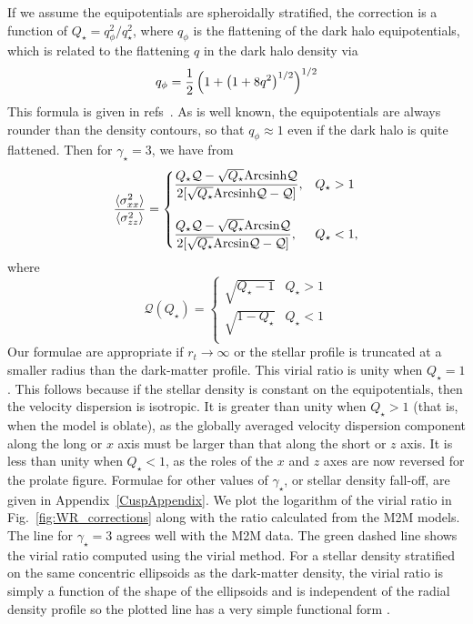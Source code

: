 \documentclass[prd,twocolumn,showpacs,preprintnumbers,superscriptaddress,nofootinbib,amsmath,amssymb,nobalancelastpage]{revtex4}
\def\arcsinh{{\rm Arcsinh}}
\def\arcsin{{\rm Arcsin}}
\begin{document}
If we assume the equipotentials are spheroidally stratified, the correction is a function of $Q_\star = q_\phi^2/q_\star^2$, where
$q_\phi$ is the flattening of the dark halo equipotentials, which is
related to the flattening $q$ in the dark halo density via
%
\begin{equation}
q_\phi = {1\over 2}\left( 1 + \left( 1 + 8q^2 \right)^{1/2}
\right)^{1/2}
\label{eq:BowdenFormula}
\end{equation}
%
This formula is given in refs~\citep{Ev93,Bo15}. As is well known, the
equipotentials are always rounder than the density contours, so that
$q_\phi \approx 1$ even if the dark halo is quite flattened.  Then for
$\gamma_\star =3$, we have from \citep{Ag12}
%
\begin{equation}
    {\langle\sigma^2_{xx}\rangle \over \langle\sigma^2_{zz}\rangle}=
    \begin{cases}
    {\displaystyle \frac{Q_\star \mathcal{Q}-\sqrt{Q_\star}\arcsinh{\mathcal{Q}}}
    {2[\sqrt{Q_\star}\arcsinh{\mathcal{Q}}-\mathcal{Q}]}},
     & Q_\star >1\\
\null & \null \cr
    {\displaystyle
    \frac{Q_\star\mathcal{Q}-\sqrt{Q_\star}\arcsin{\mathcal{Q}}}
    {2[\sqrt{Q_\star}\arcsin{\mathcal{Q}}-\mathcal{Q}]}},
     & Q_\star <1,
\end{cases}
\end{equation}
%
where
%
\begin{equation}
    \mathcal{Q}(Q_\star)=
    \begin{cases}
    \sqrt{Q_\star-1}& Q_\star>1\\
    \sqrt{1-Q_\star}& Q_\star<1\\
    \end{cases}
\label{curlyQ}
\end{equation}
%
Our formulae are appropriate if $r_t\rightarrow\infty$ or the stellar profile is truncated at a smaller radius than the dark-matter profile.
This virial ratio is unity when $Q_\star =1$. This follows because if
the stellar density is constant on the equipotentials, then the
velocity dispersion is isotropic. It is greater than unity when
$Q_\star >1$ (that is, when the model is oblate), as the globally
averaged velocity dispersion component along the long or $x$ axis must
be larger than that along the short or $z$ axis. It is less than unity
when $Q_\star <1$, as the roles of the $x$ and $z$ axes are now
reversed for the prolate figure.  Formulae for other values of
$\gamma_\star$, or stellar density fall-off, are given in
Appendix~\ref{CuspAppendix}.  We plot the logarithm of the virial ratio in
Fig.~\ref{fig:WR_corrections} along with the ratio calculated from the
M2M models. The line for $\gamma_\star=3$ agrees well with the M2M
data. The green dashed line shows the virial ratio computed using the virial method. For a stellar density stratified on the same concentric ellipsoids as the dark-matter density, the virial ratio is simply a function of the shape of the ellipsoids and is independent of the radial density profile so the plotted line has a very simple functional form \citep{Roberts1962,White1989,BT}.
\end{document}
